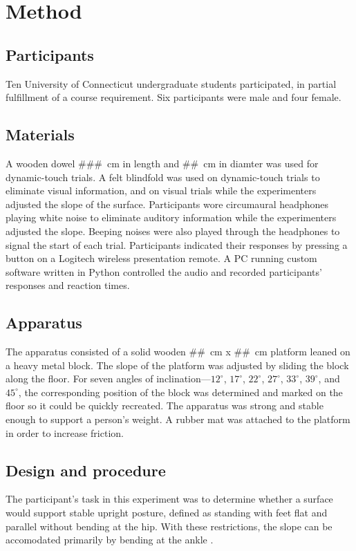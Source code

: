 \section{Method}
\subsection{Participants}
Ten University of Connecticut undergraduate students participated, in partial fulfillment of a course requirement. Six participants were male and four female.

\subsection{Materials}
A wooden dowel ###~cm in length and ##~cm in diamter was used for dynamic-touch trials. A felt blindfold was used on dynamic-touch trials to eliminate visual information, and on visual trials while the experimenters adjusted the slope of the surface. Participants wore circumaural headphones playing white noise to eliminate auditory information while the experimenters adjusted the slope. Beeping noises were also played through the headphones to signal the start of each trial.  Participants indicated their responses by pressing a button on a Logitech wireless presentation remote. A PC running custom software written in Python controlled the audio and recorded participants' responses and reaction times.

\subsection{Apparatus}
The apparatus consisted of a solid wooden ##~cm x ##~cm platform leaned on a heavy metal block. The slope of the platform was adjusted by sliding the block along the floor. For seven angles of inclination---$12^\circ$, $17^\circ$, $22^\circ$, $27^\circ$, $33^\circ$, $39^\circ$, and $45^\circ$, the corresponding position of the block was determined and marked on the floor so it could be quickly recreated. The apparatus was strong and stable enough to support a person's weight. A rubber mat was attached to the platform in order to increase friction.

\subsection{Design and procedure}
The participant's task in this experiment was to determine whether a surface would support stable upright posture, defined as standing with feet flat and parallel without bending at the hip. With these restrictions, the slope can be accomodated primarily by bending at the ankle \cite{riccio1988}.

